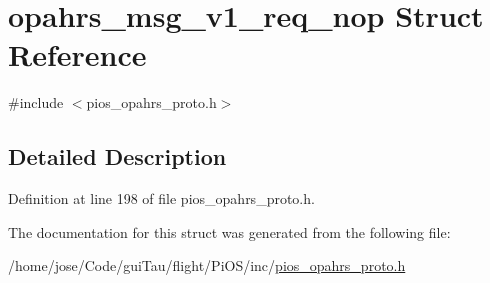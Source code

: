 \hypertarget{structopahrs__msg__v1__req__nop}{\section{opahrs\-\_\-msg\-\_\-v1\-\_\-req\-\_\-nop Struct Reference}
\label{structopahrs__msg__v1__req__nop}
}


{\ttfamily \#include $<$pios\-\_\-opahrs\-\_\-proto.\-h$>$}



\subsection{Detailed Description}


Definition at line 198 of file pios\-\_\-opahrs\-\_\-proto.\-h.



The documentation for this struct was generated from the following file\-:\begin{DoxyCompactItemize}
\item 
/home/jose/\-Code/gui\-Tau/flight/\-Pi\-O\-S/inc/\hyperlink{pios__opahrs__proto_8h}{pios\-\_\-opahrs\-\_\-proto.\-h}\end{DoxyCompactItemize}
